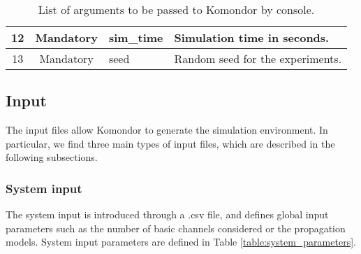 \documentclass[a4paper]{article}
\begin{document}
\begin{table}[h!]
{\begin{tabular}{|c|c|l|l|}
		12          & Mandatory     & sim\_time                          & Simulation time in seconds.                                                                                                                                                                         \\ \hline
		13          & Mandatory     & seed                               & Random seed for the experiments.                                                                                                                                                                    \\ \hline
	\end{tabular}}
	 \caption{List of arguments to be passed to Komondor by console.}
	 \label{table:arguments}
 \end{table}

\subsection{Input}
\label{section:input}	
The input files allow Komondor to generate the simulation environment. In particular, we find three main types of input files, which are described in the following subsections.

\subsubsection{System input}
\label{section:system_input}
The system input is introduced through a .csv file, and defines global input parameters such as the number of basic channels considered or the propagation models. System input parameters are defined in Table \ref{table:system_parameters}.
\end{document}
